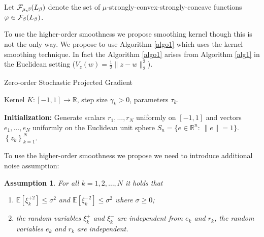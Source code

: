 \documentclass[runningheads]{llncs}
\newtheorem{assumption}{Assumption}
\newcommand{\E}{{\mathbb E}}
\def\E{\mathbb E}
\begin{document}
Let ${\cal F}_{\mu, \beta}(L_\beta)$ denote the set of $\mu$-strongly-convex-strongly-concave functions $\varphi \in {\cal F}_{\beta}(L_\beta)$. 


To use the higher-order smoothness we propose smoothing kernel though this is not the only way. We propose to use Algorithm \ref{algo1} which uses the kernel smoothing technique.
In fact the Algorithm \ref{algo1} arises from Algorithm \ref{alg1} in the Euclidean setting ($V_z(w) = \frac{1}{2} \| z-w\|_2^2$).


\begin{algorithm}[H]
\caption{Zero-order Stochastic Projected Gradient} \label{algo1}
\begin{algorithmic}
\State 
{} Kernel $K: [-1, 1] \rightarrow \mathbb{R}$, step size $\gamma_k>0$, parameters $\tau_k$.

\State
{\bf Initialization: } Generate scalars $r_1, \dots, r_N$ uniformly on $[-1,1]$ and vectors $e_1, \dots, e_N$ uniformly on the Euclidean unit sphere $S_n=\{e\in \mathbb{R}^n: \, \|e\|=1 \}$.
\EndFor
\State 
{} $\left\{z_k\right\}_{k=1}^N$.
\end{algorithmic}
\end{algorithm}

To use the higher-order smoothness we propose we need to introduce additional noise assumption:

\begin{assumption}\label{noise-ass}
    For all $k = 1, 2, \dots, N$ it holds that
    \begin{enumerate}
        \item\label{i} $\E[\xi_k^{+2}] \leq \sigma^2$ and $\E[\xi_k^{-2}] \leq \sigma^2$ where $\sigma \geq 0$;
        \item\label{ii} the random variables $\xi^+_k$ and $\xi^-_k$ are independent from $e_k$ and $r_k$, the random variables $e_k$ and $r_k$ are independent.
    \end{enumerate}
\end{assumption} 
\end{document}
